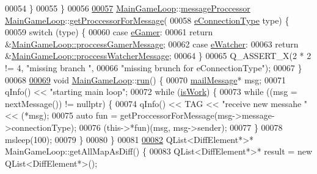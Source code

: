 \begin{DoxyCode}
00054   \}
00055 \}
00056 
\hyperlink{a00209_ab9de0ceedab969b5f7fd9e1131bc4cd5}{00057} \hyperlink{a00209_ac4cd47d8b350ae45ea09aaecad11a684}{MainGameLoop}::\hyperlink{a00209_a3aecf6efe74a0fe8b40e2d28bf4032ba}{messageProccessor} 
      \hyperlink{a00209_ac4cd47d8b350ae45ea09aaecad11a684}{MainGameLoop}::\hyperlink{a00209_ab9de0ceedab969b5f7fd9e1131bc4cd5}{getProccessorForMessage}(
00058     \hyperlink{a00008_ab66d8802c50493de7d50e181d6f8e296}{eConnectionType} type) \{
00059   \textcolor{keywordflow}{switch} (type) \{
00060     \textcolor{keywordflow}{case} \hyperlink{a00008_ab66d8802c50493de7d50e181d6f8e296ab02a4c796f7681c9c90e0c0865392828}{eGamer}:
00061       \textcolor{keywordflow}{return} &\hyperlink{a00209_ac4cd47d8b350ae45ea09aaecad11a684}{MainGameLoop}\hyperlink{a00209_ac7722494194e946c7d045471858c3aee}{::}\hyperlink{a00209_ac7722494194e946c7d045471858c3aee}{proccessGamerMessage};
00062     \textcolor{keywordflow}{case} \hyperlink{a00008_ab66d8802c50493de7d50e181d6f8e296af8a067d45287f02c8cd709a3495eb581}{eWatcher}:
00063       \textcolor{keywordflow}{return} &\hyperlink{a00209_ac4cd47d8b350ae45ea09aaecad11a684}{MainGameLoop}\hyperlink{a00209_a26ac1e61f11a51a84b6f2e770808d162}{::}\hyperlink{a00209_a26ac1e61f11a51a84b6f2e770808d162}{proccessWatcherMessage};
00064   \}
00065   Q\_ASSERT\_X(2 * 2 != 4, \textcolor{stringliteral}{"missing branch "},
00066              \textcolor{stringliteral}{"missing brunch for eConnectionType"});
00067 \}
00068 
\hyperlink{a00209_a5a20009c07c887a9cf69381f62da5009}{00069} \textcolor{keywordtype}{void} \hyperlink{a00209_ac4cd47d8b350ae45ea09aaecad11a684}{MainGameLoop}::\hyperlink{a00209_a5a20009c07c887a9cf69381f62da5009}{run}() \{
00070   \hyperlink{a00201}{mailMessage}* msg;
00071   qInfo() << \textcolor{stringliteral}{"starting main loop"};
00072   \textcolor{keywordflow}{while} (\hyperlink{a00209_a03ce2a112152dc80acce53528cc65daf}{isWork}) \{
00073     \textcolor{keywordflow}{while} ((msg = nextMessage()) != nullptr) \{
00074       qInfo() << TAG << \textcolor{stringliteral}{"receive new messahe "} << (*msg);
00075       \textcolor{keyword}{auto} fun = getProccessorForMessage(msg->message->connectionType);
00076       (\textcolor{keyword}{this}->*fun)(msg, msg->sender);
00077     \}
00078     msleep(100);
00079   \}
00080 \}
00081 
\hyperlink{a00209_ac4cd47d8b350ae45ea09aaecad11a684}{00082} QList<DiffElement*>* MainGameLoop::getAllMapAsDiff() \{
00083   QList<DiffElement*>* result = \textcolor{keyword}{new} QList<DiffElement*>();

\end{DoxyCode}
